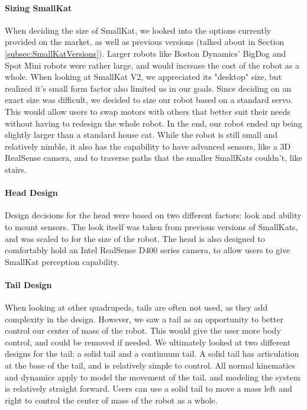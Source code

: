             \paragraph{Sizing SmallKat}
                When deciding the size of SmallKat, we looked into the options currently provided on the market, as well as previous versions (talked about in Section \ref{subsec:SmallKatVersions}). Larger robots like Boston Dynamics' BigDog and Spot Mini robots were rather large, and would increase the cost of the robot as a whole. When looking at SmallKat V2, we appreciated its "desktop" size, but realized it's small form factor also limited us in our goals. Since deciding on an exact size was difficult, we decided to size our robot based on a standard servo. This would allow users to swap motors with others that better suit their needs without having to redesign the whole robot. In the end, our robot ended up being slightly larger than a standard house cat. While the robot is still small and relatively nimble, it also has the capability to have advanced sensors, like a 3D RealSense camera, and to traverse paths that the smaller SmallKats couldn't, like stairs.

            \paragraph{Head Design}
                Design decisions for the head were based on two different factors: look and ability to mount sensors. The look itself was taken from previous versions of SmallKats, and was scaled to for the size of the robot. The head is also designed to comfortably hold an Intel RealSense D400 series camera, to allow users to give SmallKat perception capability.

            \paragraph{Tail Design}
                When looking at other quadrupeds, tails are often not used, as they add complexity in the design. However, we saw a tail as an opportunity to better control our center of mass of the robot. This would give the user more body control, and could be removed if needed. We ultimately looked at two different designs for the tail: a solid tail and a continuum tail. A solid tail has articulation at the base of the tail, and is relatively simple to control. All normal kinematics and dynamics apply to model the movement of the tail, and modeling the system is relatively straight forward. Users can use a solid tail to move a mass left and right to control the center of mass of the robot as a whole.

